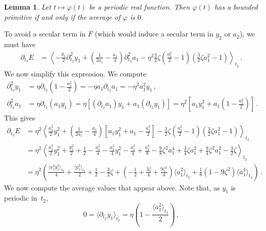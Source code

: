 \documentclass[11pt,english,reqno]{article}
\theoremstyle{plain}
\newtheorem{lem}[proposition]{Lemma}
\theoremstyle{definition}
\theoremstyle{remark}
\numberwithin{equation}{section}
\begin{document}
            \begin{lem}
                \label{lem:periodic}
                Let $t \mapsto \varphi(t)$ be a periodic real function. Then $\varphi(t)$ has a bounded primitive if and only if the average of $\varphi$ is $0$.
            \end{lem}To avoid a secular term in $F$ (which would induce a secular term in $y_2$ or $a_2$), we must have 
\begin{align*}
    \partial_{t_3} E &= \left\langle -\frac{y_1}{2} \partial_{t_2}^2 y_1 + \left(\frac{1}{2a_1} - \frac{a_1}{4}  \right)\partial_{t_2}^2a_1- \eta^2 \frac{3}{2} \zeta \left(\frac{a_1^2}{2}-1\right)\left(\frac{3}{2}\zeta a_1^2 - 1\right)\right\rangle_{t_2} \, .
\end{align*}
We now simplify this expression. We compute 
\begin{align*}
    \partial_{t_2}^2 y_1 &= \eta \partial_{t_2} \left(1 - \frac{a_1^2}{2}\right) = - \eta a_1 \partial_{t_2} a_1 = - \eta^2 a_1^2 y_1 \, , \\
    \partial_{t_2}^2 a_1 &= \eta \partial_{t_2} (a_1 y_1) = \eta \left[(\partial_{t_2}a_1) y_1 + a_1 (\partial_{t_2} y_1)\right] = \eta^2 \left[a_1 y_1^2 + a_1 \left(1-\frac{a_1^2}{2}\right)\right] \, .
\end{align*}
This gives
\begin{align*}
    \partial_{t_3} E &= \eta^2 \left\langle \frac{a_1^2}{2} y_1^2 + \left(\frac{1}{2a_1} - \frac{a_1}{4}\right) \left[a_1 y_1^2 + a_1 - \frac{a_1^3}{2}\right] - \frac{3}{2} \zeta \left(\frac{a_1^2}{2}-1\right)\left(\frac{3}{2}\zeta a_1^2 - 1\right)\right\rangle_{t_2} \\
    &= \eta^2 \left\langle \frac{a_1^2}{2} y_1^2 + \frac{y_1^2}{2} + \frac{1}{2} - \frac{a_1^2}{4} -  \frac{a_1^2}{4} y_1^2 - \frac{a_1^2}{4} + \frac{a_1^4}{8} - \frac{9}{8} \zeta^2 a_1^4 + \frac{3}{4} \zeta a_1^2 + \frac{9}{4} \zeta^2 a_1^2 - \frac{3}{2} \zeta\right\rangle_{t_2} \\
    &= \eta^2 \left( \frac{\langle a_1^2 y_1^2 \rangle_{t_2}}{4} + \frac{\langle y_1^2 \rangle_{t_2}}{2} + \frac{1}{2} - \frac{3}{2} \zeta  + \left(-\frac{1}{2} + \frac{3\zeta}{4} + \frac{9\zeta^2}{4}\right) \langle a_1^2 \rangle_{t_2} + \frac{1}{8} \left(1 - 9 \zeta^2\right) \langle a_1^4 \rangle_{t_2} \right) \, .
\end{align*}
We now compute the average values that appear above. Note that, as $y_1$ is periodic in~$t_2$, 
\begin{equation*}
    0 = \langle \partial_{t_2} y_1 \rangle_{t_2} = \eta \left(1 - \frac{\langle a_1^2 \rangle_{t_2}}{2}\right) \, ,
\end{equation*}
\end{document}
